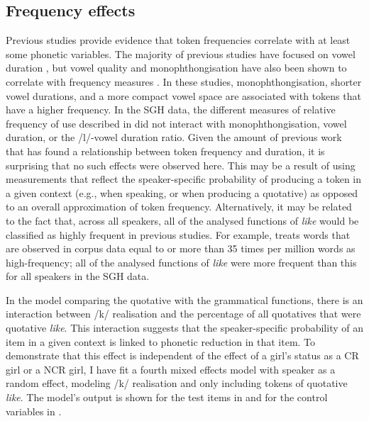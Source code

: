\subsection{Frequency effects}
\largerpage[-1]
Previous studies provide evidence that token frequencies correlate with at least some phonetic variables. The majority of previous studies have focused on vowel duration \citep{bybee2001,jurafskyetal2002,gahl-thyme}, but vowel quality and monophthongisation have also been shown to correlate with frequency measures \citep{munson2007,oprah1999}. In these studies, monophthongisation, shorter vowel durations, and a more compact vowel space are associated with tokens that have a higher frequency. In the SGH data, the different measures of relative frequency of use described in  did not interact with monophthongisation, vowel duration, or the /l/-vowel duration ratio. Given the amount of previous work that has found a relationship between token frequency and duration, it is surprising that no such effects were observed here. This may be a result of using measurements that reflect the speaker-specific probability of producing a token in a given context (e.g., when speaking, or when producing a quotative) as opposed to an overall approximation of token frequency. Alternatively, it may be related to the fact that, across all speakers, all of the analysed functions of \textit{like} would be classified as highly frequent in previous studies. For example, \citet{bybee2002} treats words that are observed in corpus data equal to or more than 35 times per million words as high-frequency; all of the analysed functions of \textit{like} were more frequent than this for all speakers in the SGH data. 

In the model comparing the quotative with the grammatical functions, there is an interaction between /k/ realisation and the percentage of all quotatives that were quotative \textit{like}. This interaction suggests that the speaker-specific probability of an item in a given context is linked to phonetic reduction in that item. To demonstrate that this effect is independent of the effect of a girl's status as a CR girl or a NCR girl, I have fit a fourth mixed effects model with speaker as a random effect, modeling /k/ realisation and only including tokens of quotative \textit{like}. The model's output is shown for the test items in  and for the control variables in .

